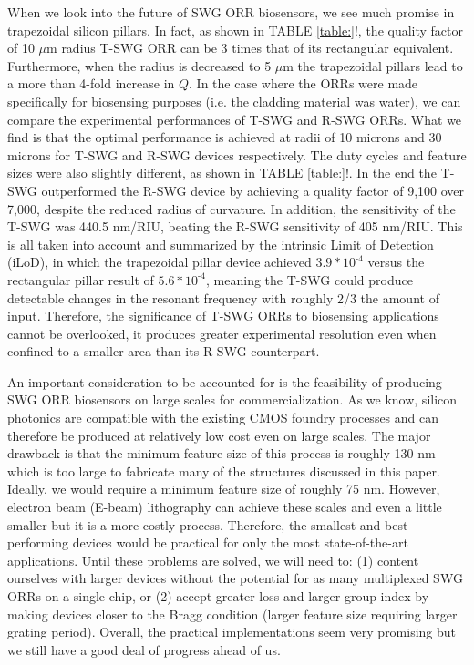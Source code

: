 \documentclass[aps,prl,twocolumn, superscriptaddress,nobalancelastpage]{revtex4}
\begin{document}
When we look into the future of SWG ORR biosensors, we see much promise in trapezoidal silicon pillars. In fact, as shown in TABLE \ref{table:}!, the quality factor of 10 $\mu$m radius T-SWG ORR can be 3 times that of its rectangular equivalent. Furthermore, when the radius is decreased to 5 $\mu$m the trapezoidal pillars lead to a more than 4-fold increase in $Q$. In the case where the ORRs were made specifically for biosensing purposes (i.e. the cladding material was water), we can compare the experimental performances of T-SWG and R-SWG ORRs. What we find is that the optimal performance is achieved at radii of 10 microns and 30 microns for T-SWG and R-SWG devices respectively. The duty cycles and feature sizes were also slightly different, as shown in TABLE \ref{table:}!. In the end the T-SWG outperformed the R-SWG device by achieving a quality factor of 9,100 over 7,000, despite the reduced radius of curvature. In addition, the sensitivity of the T-SWG was 440.5 nm/RIU, beating the R-SWG sensitivity of 405 nm/RIU. This is all taken into account and summarized by the intrinsic Limit of Detection (iLoD), in which the trapezoidal pillar device achieved $3.9*10^\text{-4}$ versus the rectangular pillar result of $5.6*10^\text{-4}$, meaning the T-SWG could produce detectable changes in the resonant frequency with roughly 2/3 the amount of input. Therefore, the significance of T-SWG ORRs to biosensing applications cannot be overlooked, it produces greater experimental resolution even when confined to a smaller area than its R-SWG counterpart.

An important consideration to be accounted for is the feasibility of producing SWG ORR biosensors on large scales for commercialization. As we know, silicon photonics are compatible with the existing CMOS foundry processes and can therefore be produced at relatively low cost even on large scales. The major drawback is that the minimum feature size of this process is roughly 130 nm which is too large to fabricate many of the structures discussed in this paper. Ideally, we would require a minimum feature size of roughly 75 nm. However, electron beam (E-beam) lithography can achieve these scales and even a little smaller but it is a more costly process. Therefore, the smallest and best performing devices would be practical for only the most state-of-the-art applications. Until these problems are solved, we will need to: (1) content ourselves with larger devices without the potential for as many multiplexed SWG ORRs on a single chip, or (2) accept greater loss and larger group index by making devices closer to the Bragg condition (larger feature size requiring larger grating period). Overall, the practical implementations seem very promising but we still have a good deal of progress ahead of us.
\end{document}
